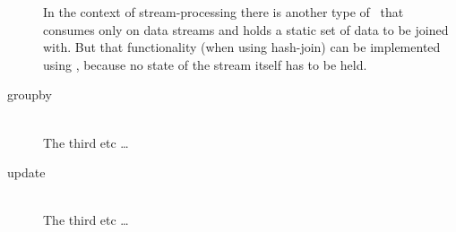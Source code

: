 \begin{description}
In the context of stream-processing there is another type of \join\ that consumes only on data streams and holds a static set of data to be joined with. But that functionality (when using hash-join) can be implemented using \map, because no state of the stream itself has to be held.
	\item[groupby] \hfill \\
  The third etc \ldots
	\item[update] \hfill \\
  The third etc \ldots
\end{description}


